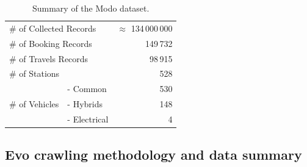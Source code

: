 \begin{table}[tbh]
\centering
\scriptsize
\begin{tabular}{llr}
\hline
\multicolumn{2}{l}{\# of Collected Records}  & $\approx$ 134\,000\,000\\
\multicolumn{2}{l}{\# of Booking Records} & 149\,732  \\
\multicolumn{2}{l}{\# of Travels Records} & 98\,915   \\
\multicolumn{2}{l}{\# of Stations} & 528    \\\hline   
\multirow{3}{*}{\# of Vehicles}       & - Common    & 530 \\
                                      & - Hybrids  & 148 \\
                                      & - Electrical & 4 \\
                                      \hline
\end{tabular}
\caption{Summary of the Modo dataset.}
\label{table:dataModo}
\end{table}



\subsection{Evo crawling methodology and data summary}


